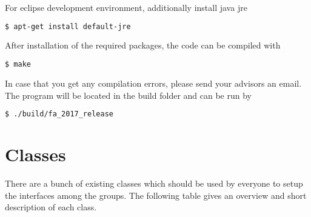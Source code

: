 \documentclass[11pt,a4paper]{article}
\begin{document}

For eclipse development environment, additionally install java jre
\begin{lstlisting}[language=sh]
$ apt-get install default-jre
\end{lstlisting}

After installation of the required packages, the code can be compiled with

\begin{lstlisting}[language=sh]
$ make
\end{lstlisting}

In case that you get any compilation errors, please send your advisors an
email. The program will be located in the build folder and can be run by

\begin{lstlisting}[language=sh]
$ ./build/fa_2017_release
\end{lstlisting}





\section{Classes}

There are a bunch of existing classes which should be used by everyone to setup
the interfaces among the groups.
The following table gives an overview and short description of each class.
\end{document}
